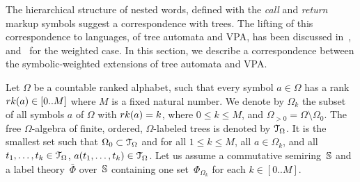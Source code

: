 %

The hierarchical structure of nested words, defined with the \emph{call} 
and \emph{return} markup symbols
suggest a correspondence with trees.
The lifting of this correspondence to languages, of tree automata and VPA,
has been discussed in~\cite{AlurMadhusudan09nested},
and~\cite{Caralp12VPAmult} for the weighted case.
In this section, we describe a correspondence between the symbolic-weighted extensions
of tree automata and VPA.

Let $\Omega$ be a countable ranked alphabet, such that
every symbol $a \in \Omega$ has a rank
$\rank(a) \in [0..M]$ where $M$ is a fixed natural number.
We denote by $\Omega_k$ the subset of all symbols $a$ of $\Omega$
with $\rank(a) = k$, where $0 \leq k \leq M$,
and $\Omega_{>0} = \Omega \setminus \Omega_0$.
%
\noindent
The free $\Omega$-algebra of finite, ordered,
$\Omega$-labeled trees is denoted by $\mathcal{T}_\Omega$.
It is the smallest set such that  $\Omega_0 \subset \mathcal{T}_\Omega$
and for all $1 \leq k \leq M$, all $a \in \Omega_k$,
and all $t_1, \ldots, t_k \in \mathcal{T}_\Omega$, $a(t_1, \ldots, t_k) \in \mathcal{T}_\Omega$.
%
%
Let us assume a commutative semiring~$\mathbb{S}$
and a label theory~$\bar{\Phi}$ over~$\mathbb{S}$
containing one set~$\Phi_{\Omega_k}$ for each $k \in [0..M]$.
%
\renewcommand{\call}[1]{\ensuremath \langle_{#1}}
\renewcommand{\return}[1]{\ensuremath {}_{#1}{\rangle}} %

